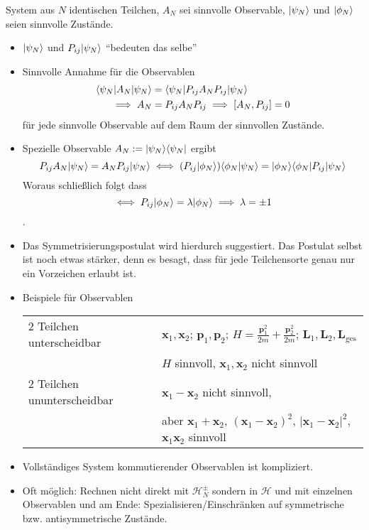 \documentclass[11pt,a4paper]{report}
\renewcommand{\vec}{\boldsymbol}
\begin{document}
System aus $N$ identischen Teilchen, $A_N$ sei sinnvolle Observable, $|\psi_N\rangle$ und $|\phi_N\rangle$ seien sinnvolle Zustände.
\begin{itemize}
    \item $|\psi_N\rangle$ und $P_{i j} |\psi_N\rangle$ ``bedeuten das selbe''
    \item Sinnvolle Annahme für die Observablen
    \begin{align*}
        \langle \psi_N | A_N |\psi_N\rangle &= \langle \psi_N | P_{ i j} A_N P_{i j} |\psi_N\rangle \\
        \implies A_N &= P_{i j} A_N P_{i j} \implies [A_N, P_{i j}] = 0
    \end{align*}
    für jede sinnvolle Observable auf dem Raum der sinnvollen Zustände.
    \item Spezielle Observable $A_N := |\psi_N\rangle \langle \psi_N |$ ergibt $$P_{i j} A_N |\psi_N\rangle = A_N P_{i j} |\psi_N\rangle \iff  (P_{i j} |\phi_N\rangle) \langle \phi_N | \psi_N \rangle = |\phi_N\rangle \langle \phi_N | P_{i j} |\psi_N\rangle$$
    Woraus schließlich folgt dass $$\iff P_{i j} |\phi_N\rangle = \lambda |\phi_N\rangle \implies \lambda=\pm 1$$.
    \item Das Symmetrisierungspostulat wird hierdurch suggestiert.  Das Postulat selbst ist noch etwas stärker, denn es besagt, dass für jede Teilchensorte genau nur ein Vorzeichen erlaubt ist.
    \item Beispiele für Observablen
    \begin{table}[hb!]
        \centering
        \begin{tabular}{|l|l|}
            \hline
            2 Teilchen unterscheidbar & $\vec{x}_1, \vec{x}_2$; $\vec{p}_1, \vec{p}_2$; $H = \frac{\vec{p}_1^2}{2m} + \frac{\vec{p}_2^2}{2m}$; $\vec{L}_1, \vec{L}_2, \vec{L}_{\text{ges}}$ \\
            & $H$ sinnvoll, $\vec{x}_1, \vec{x}_2$ nicht sinnvoll \\\hline
            2 Teilchen ununterscheidbar & $\vec{x}_1 - \vec{x}_2$ nicht sinnvoll, \\
            & aber $\vec{x}_1 + \vec{x}_2$, $(\vec{x}_1 - \vec{x}_2)^2$, $|\vec{x}_1 - \vec{x}_2|^2$, $\vec{x}_1 \vec{x}_2$ sinnvoll \\
            \hline
        \end{tabular}
    \end{table}
    \item Vollständiges System kommutierender Observablen ist kompliziert.
    \item Oft möglich: Rechnen nicht direkt mit $\mathcal{H}_N^{\pm}$ sondern in $\mathcal{H}$ und mit einzelnen Observablen und am Ende: Spezialisieren/Einschränken auf symmetrische bzw. antisymmetrische Zustände.
\end{itemize}
\end{document}
